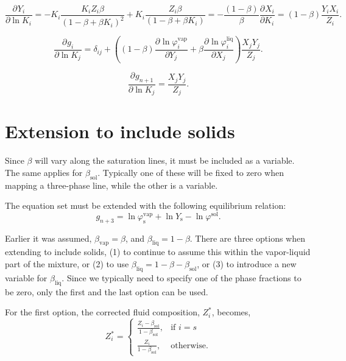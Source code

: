 \documentclass[english]{../thermomemo/thermomemo}
\newcommand*{\pd}[3][]{\frac{\partial^{#1}#2}{\partial{#3}^{#1}}}%
\newcommand{\sol}{\text{sol}}
\newcommand{\liq}{\text{liq}}
\newcommand{\vap}{\text{vap}}
\newcommand{\scomp}{\text{s}\xspace}
\begin{document}
\begin{equation}
   \pd{Y_i}{\ln K_i} = -K_i\frac{K_i Z_i\beta}{\left(1-\beta+\beta K_i\right)^2} + K_i\frac{Z_i\beta}{\left(1-\beta+\beta K_i\right)} = -\frac{\left(1-\beta\right)}{\beta}\pd{X_i}{K_i} = \left(1-\beta\right)\frac{Y_iX_i}{Z_i}.
\end{equation}

\begin{equation}
   \pd{g_i}{\ln K_j} = \delta_{ij} + \left(\left(1-\beta\right)\pd{\ln \varphi^\vap_i}{Y_j} + \beta\pd{\ln \varphi^\liq_i}{X_j}\right)\frac{X_jY_j}{Z_j}.
\end{equation}

\begin{equation}
   \pd{g_{n+1}}{\ln K_j} = \frac{X_jY_j}{Z_j}.
\end{equation}

\section{Extension to include solids}


Since $\beta$ will vary along the saturation lines, it must be included as a variable. The same applies for $\beta_\sol$. Typically one of these will be fixed to zero when mapping a three-phase line, while the other is a variable.

The equation set must be extended with the following equilibrium relation:
\begin{equation}
  \label{eq:soleq}
   g_{n+3} = \ln \varphi^\vap_\scomp + \ln Y_\scomp - \ln \varphi^\sol .
\end{equation}

Earlier it was assumed, $\beta_\vap = \beta$, and $\beta_\liq = 1-\beta$. There are three options when extending to include solids, (1) to continue to assume this within the vapor-liquid part of the mixture, or (2) to use $\beta_\liq = 1-\beta-\beta_\sol$, or (3) to introduce a new variable for $\beta_\liq$. Since we typically need to specify one of the phase fractions to be zero, only the first and the last option can be used.

For the first option, the corrected fluid composition, $Z_i^*$, becomes,
\begin{equation}
  Z_i^* = \begin{cases}
    \frac{Z_i - \beta_\sol}{1-\beta_\sol},& \text{if } i = s\\
    \frac{Z_i}{1-\beta_\sol},            & \text{otherwise}.
\end{cases}
\label{eq:z_mod}
\end{equation}
\end{document}
